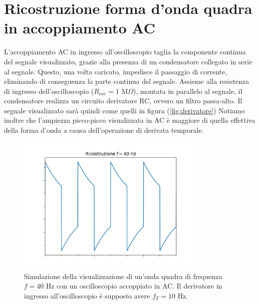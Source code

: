 \documentclass{article}[a4paper, oneside,11pt]
\begin{document}
\section{Ricostruzione forma d'onda quadra in accoppiamento AC}
    L'accoppiamento AC in ingresso all'oscilloscopio taglia la componente continua del segnale visualizzato, grazie alla presenza di un condensatore collegato in serie al segnale. Questo, una volta caricato, impedisce il passaggio di corrente, eliminando di conseguenza la parte continua del segnale. Assieme alla resistenza di ingresso dell'oscilloscopio ($R_{osc} = 1$ M$\Omega$), montata in parallelo al segnale, il condensatore realizza un circuito derivatore RC, ovvero un filtro passa-alto. Il segnale visualizzato sarà quindi come quelli in figura (\ref{fig:derivatore})
    Notiamo inoltre che l'ampiezza picco-picco visualizzata in AC è maggiore di quella effettiva della forma d'onda a causa dell'operazione di derivata temporale. 
    \begin{figure}[H]
        \centering
        \includegraphics[width=0.80\textwidth]{img/Accoppiamento_AC.png}
        \caption{Simulazione della visualizzazione di un'onda quadra di frequenza $f = 40$ Hz con un oscilloscopio accoppiato in AC. Il derivatore in ingresso all'oscilloscopio è supposto avere $f_T = 10$ Hz.}
    \end{figure}
\end{document}
